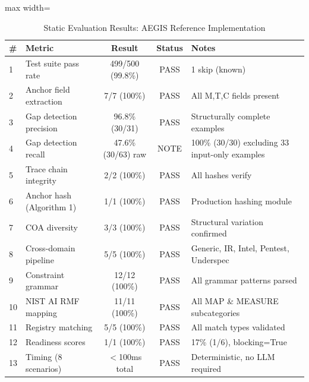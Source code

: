\begin{table}[H]
\caption{Static Evaluation Results: AEGIS Reference Implementation}
\label{tab:static-eval}
\centering
\small
\begin{adjustbox}{max width=\textwidth}
\begin{tabular}{@{}llccl@{}}
\toprule
\textbf{\#} & \textbf{Metric} & \textbf{Result} & \textbf{Status} & \textbf{Notes} \\
\midrule
1  & Test suite pass rate         & 499/500 (99.8\%) & PASS & 1 skip (known) \\
2  & Anchor field extraction      & 7/7 (100\%)      & PASS & All M,T,C fields present \\
3  & Gap detection precision      & 96.8\% (30/31)   & PASS & Structurally complete examples \\
4  & Gap detection recall         & 47.6\% (30/63) raw & NOTE & 100\% (30/30) excluding 33 input-only examples \\
5  & Trace chain integrity        & 2/2 (100\%)      & PASS & All hashes verify \\
6  & Anchor hash (Algorithm 1)    & 1/1 (100\%)      & PASS & Production hashing module \\
7  & COA diversity                & 3/3 (100\%)      & PASS & Structural variation confirmed \\
8  & Cross-domain pipeline        & 5/5 (100\%)      & PASS & Generic, IR, Intel, Pentest, Underspec \\
9  & Constraint grammar           & 12/12 (100\%)    & PASS & All grammar patterns parsed \\
10 & NIST AI RMF mapping          & 11/11 (100\%)    & PASS & All MAP \& MEASURE subcategories \\
11 & Registry matching            & 5/5 (100\%)      & PASS & All match types validated \\
12 & Readiness scores             & 1/1 (100\%)      & PASS & 17\% (1/6), blocking=True \\
13 & Timing (8 scenarios)         & $<$100ms total   & PASS & Deterministic, no LLM required \\
\bottomrule
\end{tabular}
\end{adjustbox}
\end{table}
